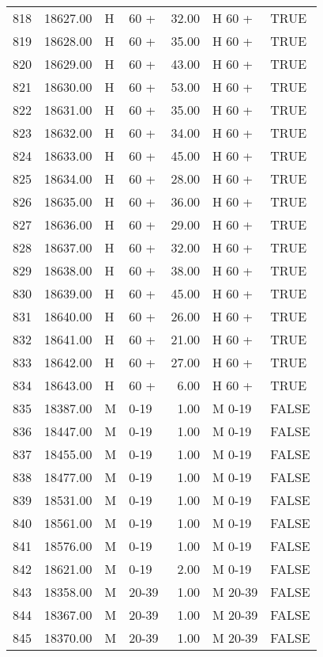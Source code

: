 \begin{table}[ht]
\begin{tabular}{rrllrll}
  818 & 18627.00 & H & 60 + & 32.00 & H 60 + & TRUE \\ 
  819 & 18628.00 & H & 60 + & 35.00 & H 60 + & TRUE \\ 
  820 & 18629.00 & H & 60 + & 43.00 & H 60 + & TRUE \\ 
  821 & 18630.00 & H & 60 + & 53.00 & H 60 + & TRUE \\ 
  822 & 18631.00 & H & 60 + & 35.00 & H 60 + & TRUE \\ 
  823 & 18632.00 & H & 60 + & 34.00 & H 60 + & TRUE \\ 
  824 & 18633.00 & H & 60 + & 45.00 & H 60 + & TRUE \\ 
  825 & 18634.00 & H & 60 + & 28.00 & H 60 + & TRUE \\ 
  826 & 18635.00 & H & 60 + & 36.00 & H 60 + & TRUE \\ 
  827 & 18636.00 & H & 60 + & 29.00 & H 60 + & TRUE \\ 
  828 & 18637.00 & H & 60 + & 32.00 & H 60 + & TRUE \\ 
  829 & 18638.00 & H & 60 + & 38.00 & H 60 + & TRUE \\ 
  830 & 18639.00 & H & 60 + & 45.00 & H 60 + & TRUE \\ 
  831 & 18640.00 & H & 60 + & 26.00 & H 60 + & TRUE \\ 
  832 & 18641.00 & H & 60 + & 21.00 & H 60 + & TRUE \\ 
  833 & 18642.00 & H & 60 + & 27.00 & H 60 + & TRUE \\ 
  834 & 18643.00 & H & 60 + & 6.00 & H 60 + & TRUE \\ 
  835 & 18387.00 & M & 0-19 & 1.00 & M 0-19 & FALSE \\ 
  836 & 18447.00 & M & 0-19 & 1.00 & M 0-19 & FALSE \\ 
  837 & 18455.00 & M & 0-19 & 1.00 & M 0-19 & FALSE \\ 
  838 & 18477.00 & M & 0-19 & 1.00 & M 0-19 & FALSE \\ 
  839 & 18531.00 & M & 0-19 & 1.00 & M 0-19 & FALSE \\ 
  840 & 18561.00 & M & 0-19 & 1.00 & M 0-19 & FALSE \\ 
  841 & 18576.00 & M & 0-19 & 1.00 & M 0-19 & FALSE \\ 
  842 & 18621.00 & M & 0-19 & 2.00 & M 0-19 & FALSE \\ 
  843 & 18358.00 & M & 20-39 & 1.00 & M 20-39 & FALSE \\ 
  844 & 18367.00 & M & 20-39 & 1.00 & M 20-39 & FALSE \\ 
  845 & 18370.00 & M & 20-39 & 1.00 & M 20-39 & FALSE \\ 

\end{tabular}
\end{table}
